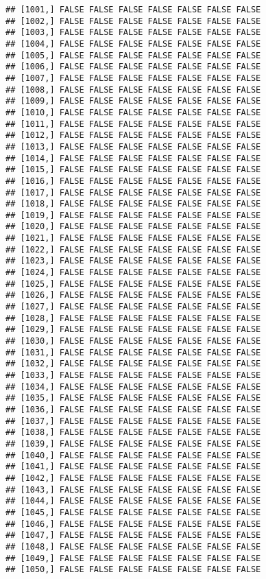 \documentclass[
]{article}
\begin{document}
\begin{verbatim}
## [1001,] FALSE FALSE FALSE FALSE FALSE FALSE FALSE
## [1002,] FALSE FALSE FALSE FALSE FALSE FALSE FALSE
## [1003,] FALSE FALSE FALSE FALSE FALSE FALSE FALSE
## [1004,] FALSE FALSE FALSE FALSE FALSE FALSE FALSE
## [1005,] FALSE FALSE FALSE FALSE FALSE FALSE FALSE
## [1006,] FALSE FALSE FALSE FALSE FALSE FALSE FALSE
## [1007,] FALSE FALSE FALSE FALSE FALSE FALSE FALSE
## [1008,] FALSE FALSE FALSE FALSE FALSE FALSE FALSE
## [1009,] FALSE FALSE FALSE FALSE FALSE FALSE FALSE
## [1010,] FALSE FALSE FALSE FALSE FALSE FALSE FALSE
## [1011,] FALSE FALSE FALSE FALSE FALSE FALSE FALSE
## [1012,] FALSE FALSE FALSE FALSE FALSE FALSE FALSE
## [1013,] FALSE FALSE FALSE FALSE FALSE FALSE FALSE
## [1014,] FALSE FALSE FALSE FALSE FALSE FALSE FALSE
## [1015,] FALSE FALSE FALSE FALSE FALSE FALSE FALSE
## [1016,] FALSE FALSE FALSE FALSE FALSE FALSE FALSE
## [1017,] FALSE FALSE FALSE FALSE FALSE FALSE FALSE
## [1018,] FALSE FALSE FALSE FALSE FALSE FALSE FALSE
## [1019,] FALSE FALSE FALSE FALSE FALSE FALSE FALSE
## [1020,] FALSE FALSE FALSE FALSE FALSE FALSE FALSE
## [1021,] FALSE FALSE FALSE FALSE FALSE FALSE FALSE
## [1022,] FALSE FALSE FALSE FALSE FALSE FALSE FALSE
## [1023,] FALSE FALSE FALSE FALSE FALSE FALSE FALSE
## [1024,] FALSE FALSE FALSE FALSE FALSE FALSE FALSE
## [1025,] FALSE FALSE FALSE FALSE FALSE FALSE FALSE
## [1026,] FALSE FALSE FALSE FALSE FALSE FALSE FALSE
## [1027,] FALSE FALSE FALSE FALSE FALSE FALSE FALSE
## [1028,] FALSE FALSE FALSE FALSE FALSE FALSE FALSE
## [1029,] FALSE FALSE FALSE FALSE FALSE FALSE FALSE
## [1030,] FALSE FALSE FALSE FALSE FALSE FALSE FALSE
## [1031,] FALSE FALSE FALSE FALSE FALSE FALSE FALSE
## [1032,] FALSE FALSE FALSE FALSE FALSE FALSE FALSE
## [1033,] FALSE FALSE FALSE FALSE FALSE FALSE FALSE
## [1034,] FALSE FALSE FALSE FALSE FALSE FALSE FALSE
## [1035,] FALSE FALSE FALSE FALSE FALSE FALSE FALSE
## [1036,] FALSE FALSE FALSE FALSE FALSE FALSE FALSE
## [1037,] FALSE FALSE FALSE FALSE FALSE FALSE FALSE
## [1038,] FALSE FALSE FALSE FALSE FALSE FALSE FALSE
## [1039,] FALSE FALSE FALSE FALSE FALSE FALSE FALSE
## [1040,] FALSE FALSE FALSE FALSE FALSE FALSE FALSE
## [1041,] FALSE FALSE FALSE FALSE FALSE FALSE FALSE
## [1042,] FALSE FALSE FALSE FALSE FALSE FALSE FALSE
## [1043,] FALSE FALSE FALSE FALSE FALSE FALSE FALSE
## [1044,] FALSE FALSE FALSE FALSE FALSE FALSE FALSE
## [1045,] FALSE FALSE FALSE FALSE FALSE FALSE FALSE
## [1046,] FALSE FALSE FALSE FALSE FALSE FALSE FALSE
## [1047,] FALSE FALSE FALSE FALSE FALSE FALSE FALSE
## [1048,] FALSE FALSE FALSE FALSE FALSE FALSE FALSE
## [1049,] FALSE FALSE FALSE FALSE FALSE FALSE FALSE
## [1050,] FALSE FALSE FALSE FALSE FALSE FALSE FALSE

\end{verbatim}
\end{document}
